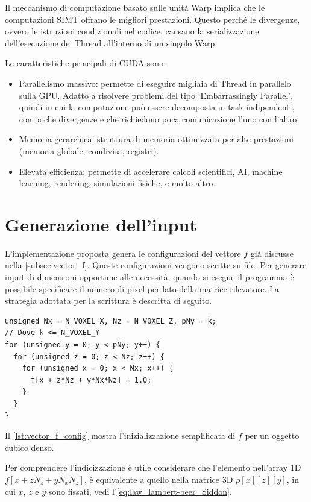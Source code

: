 \documentclass[12pt,a4paper]{report}
\begin{document}
Il meccanismo di computazione basato sulle unità Warp implica che le computazioni SIMT offrano le migliori prestazioni.
Questo perché le divergenze, ovvero le istruzioni condizionali nel codice, causano la serializzazione dell'esecuzione dei Thread
all'interno di un singolo Warp.

Le caratteristiche principali di CUDA sono:
\begin{itemize}
  \item Parallelismo massivo: permette di eseguire migliaia di Thread in parallelo sulla GPU. Adatto a risolvere problemi del
        tipo `Embarrassingly Parallel', quindi in cui la computazione può essere decomposta in task indipendenti, con poche
        divergenze e che richiedono poca comunicazione l'uno con l'altro.
  \item Memoria gerarchica: struttura di memoria ottimizzata per alte prestazioni (memoria globale, condivisa, registri).
  \item Elevata efficienza: permette di accelerare calcoli scientifici, AI, machine learning, rendering, simulazioni fisiche, e
        molto altro.
\end{itemize}

\section{Generazione dell'input}

L'implementazione proposta genera le configurazioni del vettore \(f\) già discusse nella \autoref{subsec:vector_f}.
Queste configurazioni vengono scritte su file.
Per generare input di dimensioni opportune alle necessità, quando si esegue il programma è possibile specificare il numero di
pixel per lato della matrice rilevatore.
La strategia adottata per la scrittura è descritta di seguito.

\begin{lstlisting}[language=CStyle, caption={Codice C per l'inizializzazione di \(f\) per un cubo.}, label={lst:vector_f_config}]
unsigned Nx = N_VOXEL_X, Nz = N_VOXEL_Z, pNy = k;
// Dove k <= N_VOXEL_Y
for (unsigned y = 0; y < pNy; y++) {
  for (unsigned z = 0; z < Nz; z++) {
    for (unsigned x = 0; x < Nx; x++) {
      f[x + z*Nz + y*Nx*Nz] = 1.0;
    }
  }
}
\end{lstlisting}

Il \autoref{lst:vector_f_config} mostra l'inizializzazione semplificata di \(f\) per un oggetto cubico denso.

Per comprendere l'indicizzazione è utile considerare che l'elemento nell'array 1D \(f[x + z N_z + y N_x N_z]\), è equivalente a
quello nella matrice 3D \(\rho[x][z][y]\), in cui \(x\), \(z\) e \(y\) sono fissati, vedi l'\autoref{eq:law_lambert-beer_Siddon}.
\end{document}
